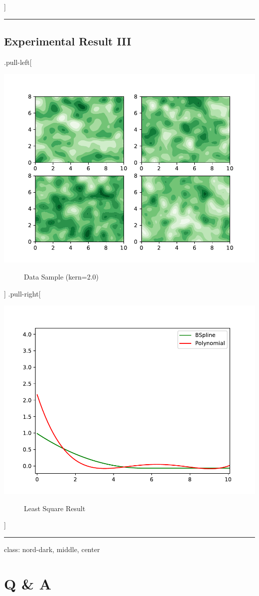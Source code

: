 \documentclass[
]{article}
\begin{document}
{]}

\begin{center}\rule{0.5\linewidth}{0.5pt}\end{center}

\subsection{Experimental Result III}\label{experimental-result-iii}

.pull-left{[}

\begin{description}
\item[\includegraphics{ellipsoid.files/iso200.pdf}]
Data Sample (kern=2.0)
\end{description}

{]} .pull-right{[}

\begin{description}
\item[\includegraphics{ellipsoid.files/result200.pdf}]
Least Square Result
\end{description}

{]}

\begin{center}\rule{0.5\linewidth}{0.5pt}\end{center}

class: nord-dark, middle, center

\section{Q \& A}\label{q-a}
\end{document}
